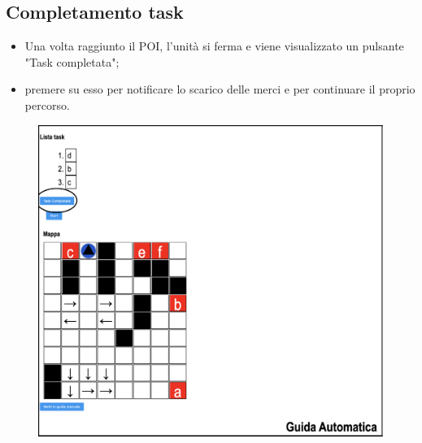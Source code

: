 \subsection{Completamento task}
\begin{itemize}
    \item Una volta raggiunto il POI, l'unità si ferma e viene visualizzato un pulsante "Task completata";
    \item premere su esso per notificare lo scarico delle merci e per continuare il proprio percorso.
\end{itemize}
\begin{figure}[H]
    \centering
    \includegraphics[scale=0.45]{res/images/forklift_taskcompletata.png}
\end{figure}
\pagebreak
